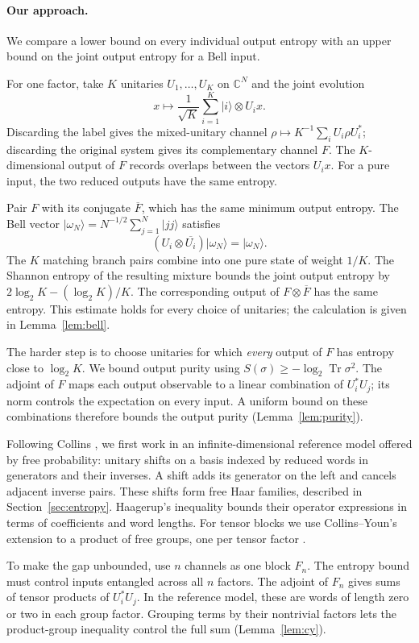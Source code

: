 \documentclass[11pt]{article}
\numberwithin{equation}{section}
\theoremstyle{boldremark}\newtheorem{remark}[theorem]{Remark}
\DeclareMathOperator{\Tr}{Tr}
\newcommand{\C}{\mathbb C}
\newcommand{\ket}[1]{\lvert #1\rangle}
\begin{document}
\paragraph{Our approach.}
We compare a lower bound on every individual output entropy with an
upper bound on the joint output entropy for a Bell input.

For one factor, take $K$ unitaries $U_1,\ldots,U_K$ on $\C^N$ and the
joint evolution
\[
 x\longmapsto\frac1{\sqrt K}\sum_{i=1}^K\ket i\otimes U_i x.
\]
Discarding the label gives the mixed-unitary channel
$\rho\mapsto K^{-1}\sum_iU_i\rho U_i^*$; discarding the original
system gives its complementary channel $F$. The $K$-dimensional
output of $F$ records overlaps between the vectors $U_i x$.
For a pure input, the two reduced outputs have the same entropy.

Pair $F$ with its conjugate $\overline F$, which has the same minimum
output entropy. The Bell vector
$\ket{\omega_N}=N^{-1/2}\sum_{j=1}^N\ket{jj}$ satisfies
\[
 (U_i\otimes\overline{U_i})\ket{\omega_N}=\ket{\omega_N}.
\]
The $K$ matching branch pairs combine into one pure state of weight
$1/K$. The Shannon entropy of the resulting mixture bounds the joint
output entropy by $2\log_2K-(\log_2K)/K$.
The corresponding output of $F\otimes\overline F$ has the same
entropy. This estimate holds for every choice of unitaries; the
calculation is given in Lemma~\ref{lem:bell}.

The harder step is to choose unitaries for which \emph{every} output
of $F$ has entropy close to $\log_2K$. We bound output purity using
$S(\sigma)\ge-\log_2\Tr\sigma^2$. The adjoint of $F$ maps each output
observable to a linear combination of $U_i^*U_j$; its norm controls
the expectation on every input. A uniform bound on these combinations
therefore bounds the output purity (Lemma~\ref{lem:purity}).

Following Collins \cite[Sections~2.2--3.3]{Collins}, we first work in
an infinite-dimensional reference model offered by free probability:
unitary shifts on a basis
indexed by reduced words in generators and their inverses. A shift
adds its generator on the left and cancels adjacent inverse pairs.
These shifts form free Haar families, described in
Section~\ref{sec:entropy}. Haagerup's inequality \cite{Haagerup} bounds
their operator expressions in terms of coefficients and word lengths.
For tensor blocks we use Collins--Youn's extension to a product of
free groups, one per tensor factor \cite{CY}.

To make the gap unbounded, use $n$ channels as one block $F_n$.
The entropy bound must control inputs entangled across all $n$
factors.
The adjoint of $F_n$ gives sums of tensor products of $U_i^*U_j$.
In the reference model, these are words of length zero or two in
each group factor. Grouping terms by their nontrivial factors lets
the product-group inequality control the full sum
(Lemma~\ref{lem:cy}).
\end{document}
